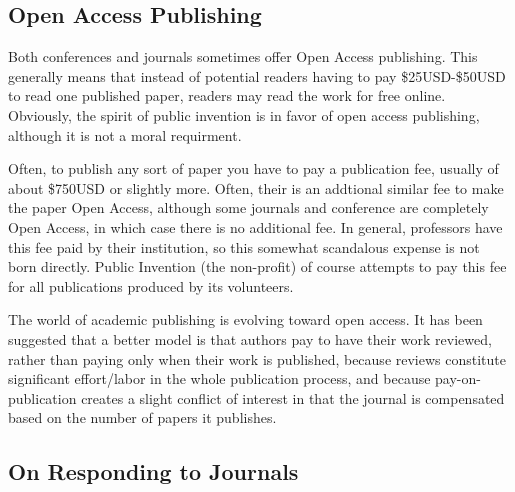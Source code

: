 \documentclass[
	fontsize=10pt, %
	twoside=false, %
	secnumdepth=1, %
]{kaobook}
\begin{document}
\subsection{Open Access Publishing}

Both conferences and journals sometimes offer Open Access publishing. This generally means
that instead of potential readers having to pay \$25USD-\$50USD to read one published paper, readers
may read the work for free online. Obviously, the spirit of public invention is in favor
of open access publishing, although it is not a moral requirment.

Often, to publish any sort of paper you have to pay a publication fee, usually of about
\$750USD or slightly more. Often, their is an addtional similar fee to make the paper Open Access,
although some journals and conference are completely Open Access, in which case there is no additional fee.
In general, professors have this fee paid by their institution,
so this somewhat scandalous expense is not born directly. Public Invention (the non-profit) of
course attempts to pay this fee for all publications produced by its volunteers.

The world of academic publishing is evolving toward open access. It has been suggested that a better
model is that authors pay to have their work reviewed, rather than paying only when their work is published,
because reviews constitute significant effort/labor in the whole publication process, and because
pay-on-publication creates a slight conflict of interest in that the journal is compensated based on
the number of papers it publishes.

\subsection{On Responding to Journals}
\end{document}
